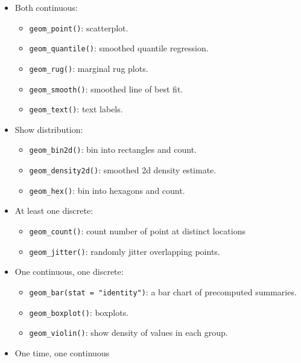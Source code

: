 \begin{itemize}
  \begin{itemize}
  \tightlist
  \item
    Both continuous:

    \begin{itemize}
    \tightlist
    \item
      \texttt{geom\_point()}: scatterplot.
    \item
      \texttt{geom\_quantile()}: smoothed quantile regression.
    \item
      \texttt{geom\_rug()}: marginal rug plots.
    \item
      \texttt{geom\_smooth()}: smoothed line of best fit.
    \item
      \texttt{geom\_text()}: text labels.
    \end{itemize}
  \item
    Show distribution:

    \begin{itemize}
    \tightlist
    \item
      \texttt{geom\_bin2d()}: bin into rectangles and count.
    \item
      \texttt{geom\_density2d()}: smoothed 2d density estimate.
    \item
      \texttt{geom\_hex()}: bin into hexagons and count.
    \end{itemize}
  \item
    At least one discrete:

    \begin{itemize}
    \tightlist
    \item
      \texttt{geom\_count()}: count number of point at distinct
      locations
    \item
      \texttt{geom\_jitter()}: randomly jitter overlapping points.
    \end{itemize}
  \item
    One continuous, one discrete:

    \begin{itemize}
    \tightlist
    \item
      \texttt{geom\_bar(stat\ =\ "identity")}: a bar chart of
      precomputed summaries.
    \item
      \texttt{geom\_boxplot()}: boxplots.
    \item
      \texttt{geom\_violin()}: show density of values in each group.
    \end{itemize}
  \item
    One time, one continuous


\end{itemize}
\end{itemize}
